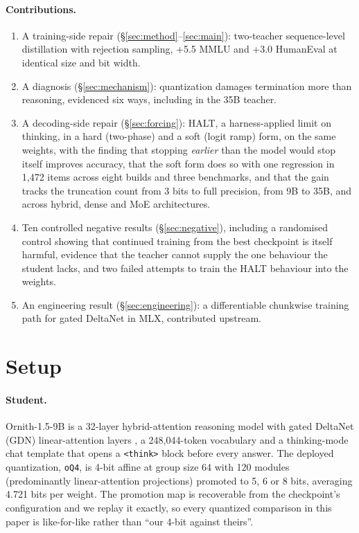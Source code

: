 \documentclass[11pt]{article}
\newcommand{\HALT}{\textsc{HALT}}
\newcommand{\Student}{Ornith-1.5-9B}
\newcommand{\oQ}{\texttt{oQ4}}
\begin{document}
\paragraph{Contributions.}
\begin{enumerate}[leftmargin=1.5em]
  \item A training-side repair (\S\ref{sec:method}--\ref{sec:main}): two-teacher
    sequence-level distillation with rejection sampling, +5.5 MMLU and +3.0
    HumanEval at identical size and bit width.
  \item A diagnosis (\S\ref{sec:mechanism}): quantization damages termination
    more than reasoning, evidenced six ways, including in the 35B teacher.
  \item A decoding-side repair (\S\ref{sec:forcing}): \HALT{}, a harness-applied
    limit on thinking, in a hard (two-phase) and a soft (logit ramp) form, on
    the same weights, with the finding that stopping \emph{earlier} than the
    model would stop itself improves accuracy, that the soft form does so with
    one regression in 1{,}472 items across eight builds and three benchmarks,
    and that the gain tracks the truncation count from 3 bits to full
    precision, from 9B to 35B, and across hybrid, dense and MoE architectures.
  \item Ten controlled negative results (\S\ref{sec:negative}), including a
    randomised control showing that continued training from the best checkpoint
    is itself harmful, evidence that the teacher cannot supply the one
    behaviour the student lacks, and two failed attempts to train the
    \HALT{} behaviour into the weights.
  \item An engineering result (\S\ref{sec:engineering}): a differentiable
    chunkwise training path for gated DeltaNet in MLX, contributed upstream.
\end{enumerate}

\section{Setup}
\label{sec:setup}

\paragraph{Student.}
\Student{} is a 32-layer hybrid-attention reasoning model with gated DeltaNet
(GDN) linear-attention layers \citep{yang2024gated}, a 248{,}044-token
vocabulary and a thinking-mode chat template that opens a \texttt{<think>}
block before every answer.  The deployed quantization, \oQ{}, is 4-bit affine
at group size 64 with 120 modules (predominantly linear-attention projections)
promoted to 5, 6 or 8 bits, averaging 4.721 bits per weight.  The promotion map
is recoverable from the checkpoint's configuration and we replay it exactly, so
every quantized comparison in this paper is like-for-like rather than ``our
4-bit against theirs''.
\end{document}
